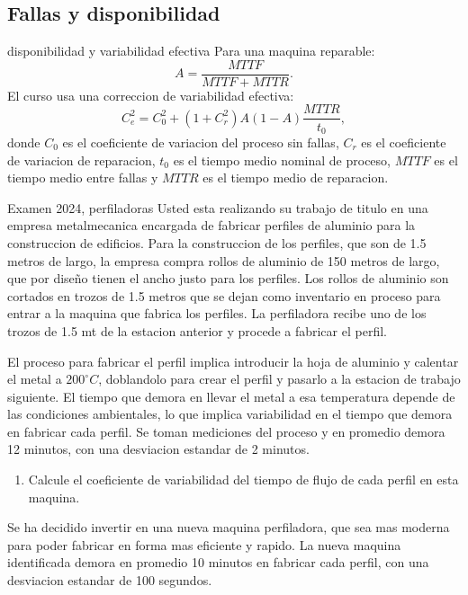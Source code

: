 \subsection{Fallas y disponibilidad}

\begin{materia}{disponibilidad y variabilidad efectiva}
Para una maquina reparable:
\[
  A=\frac{MTTF}{MTTF+MTTR}.
\]
El curso usa una correccion de variabilidad efectiva:
\[
  C_e^2=C_0^2+(1+C_r^2)A(1-A)\frac{MTTR}{t_0},
\]
donde $C_0$ es el coeficiente de variacion del proceso sin fallas, $C_r$ es el coeficiente de variacion de reparacion, $t_0$ es el tiempo medio nominal de proceso, $MTTF$ es el tiempo medio entre fallas y $MTTR$ es el tiempo medio de reparacion.
\end{materia}

\begin{enunciado}{Examen 2024, perfiladoras}
Usted esta realizando su trabajo de titulo en una empresa metalmecanica encargada de fabricar perfiles de aluminio para la construccion de edificios. Para la construccion de los perfiles, que son de 1.5 metros de largo, la empresa compra rollos de aluminio de 150 metros de largo, que por diseño tienen el ancho justo para los perfiles. Los rollos de aluminio son cortados en trozos de 1.5 metros que se dejan como inventario en proceso para entrar a la maquina que fabrica los perfiles. La perfiladora recibe uno de los trozos de 1.5 mt de la estacion anterior y procede a fabricar el perfil.

El proceso para fabricar el perfil implica introducir la hoja de aluminio y calentar el metal a $200^\circ C$, doblandolo para crear el perfil y pasarlo a la estacion de trabajo siguiente. El tiempo que demora en llevar el metal a esa temperatura depende de las condiciones ambientales, lo que implica variabilidad en el tiempo que demora en fabricar cada perfil. Se toman mediciones del proceso y en promedio demora 12 minutos, con una desviacion estandar de 2 minutos.

\begin{enumerate}[label=\alph*)]
  \item Calcule el coeficiente de variabilidad del tiempo de flujo de cada perfil en esta maquina.
\end{enumerate}

Se ha decidido invertir en una nueva maquina perfiladora, que sea mas moderna para poder fabricar en forma mas eficiente y rapido. La nueva maquina identificada demora en promedio 10 minutos en fabricar cada perfil, con una desviacion estandar de 100 segundos.


\end{enunciado}
